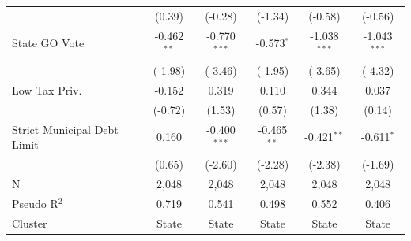 \begin{tabular*}{\textwidth}{@{\extracolsep{\fill}}lccccc}
                               & (0.39)       & (-0.28)       & (-1.34)      & (-0.58)       & (-0.56)\\
   State GO Vote               & -0.462$^{**}$ & -0.770$^{***}$ & -0.573$^{*}$  & -1.038$^{***}$ & -1.043$^{***}$\\
                               & (-1.98)      & (-3.46)       & (-1.95)      & (-3.65)       & (-4.32)\\
   Low Tax Priv.               & -0.152        & 0.319          & 0.110         & 0.344          & 0.037\\
                               & (-0.72)      & (1.53)        & (0.57)       & (1.38)        & (0.14)\\
   Strict Municipal Debt Limit & 0.160         & -0.400$^{***}$ & -0.465$^{**}$ & -0.421$^{**}$  & -0.611$^{*}$\\
                               & (0.65)       & (-2.60)       & (-2.28)      & (-2.38)       & (-1.69)\\
   \hline
   N                & 2,048         & 2,048          & 2,048         & 2,048          & 2,048\\
   Pseudo R$^2$                & 0.719         & 0.541          & 0.498         & 0.552          & 0.406\\
   Cluster              & State & State & State & State & State\\
   \bottomrule
\end{tabular*}
\par\endgroup
